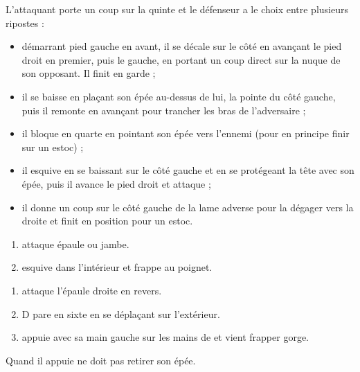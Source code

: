 \begin{exercice}

L'attaquant porte un coup sur la quinte et le défenseur a le choix entre plusieurs ripostes :
\begin{itemize}
	\item démarrant pied gauche en avant, il se décale sur le côté en avançant le pied droit en premier, puis le gauche, en portant un coup direct sur la nuque de son opposant. Il finit en garde ;
	\item il se baisse en plaçant son épée au-dessus de lui, la pointe du côté gauche, puis il remonte en avançant pour trancher les bras de l'adversaire ;
	\item il bloque en quarte en pointant son épée vers l'ennemi (pour en principe finir sur un estoc) ;
	\item il esquive en se baissant sur le côté gauche et en se protégeant la tête avec son épée, puis il avance le pied droit et attaque ;
	\item il donne un coup sur le côté gauche de la lame adverse pour la dégager vers la droite et finit en position pour un estoc.
\end{itemize}
\end{exercice}


\begin{technique}

\begin{enumerate}
	\item \A attaque épaule ou jambe.
	
	\item \D esquive dans l'intérieur et frappe au poignet.
\end{enumerate}

\end{technique}


\begin{technique}

\begin{enumerate}
	\item \A attaque l'épaule droite en revers.
	
	\item D pare en sixte en se déplaçant sur l'extérieur.
	
	\item \D appuie avec sa main gauche sur les mains de \A et vient frapper gorge.
\end{enumerate}

Quand il appuie \D ne doit pas retirer son épée.

\end{technique}



